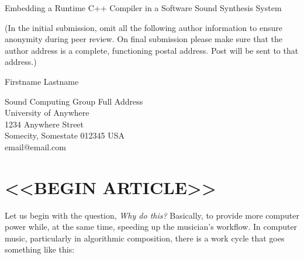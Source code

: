 \documentclass[letterpaper, 12pt]{article}
\begin{document}
{\cmjTitle Embedding a Runtime C++ Compiler in a Software Sound Synthesis System}
\vspace*{24pt}

(In the initial submission, omit all the following author information to ensure anonymity during peer review.
On final submission please make sure that the author address is a complete, functioning postal address.
Post will be sent to that address.)

{\cmjAuthor Firstname Lastname}	%
 
\begin{cmjAuthorAddress}
	Sound Computing Group Full Address\\
	University of Anywhere\\
	1234 Anywhere Street\\
	Somecity, Somestate 012345 USA\\		%
	email@email.com
\end{cmjAuthorAddress}


\begin{abstract}
	This article considers why musicians and researchers might want to use a C++ compiler embedded in a software synthesis (SWSS) system, and presents such a compiler in the form of new unit generators that embed the Clang/LLVM on-request compiler (ORC) in Csound. C++ source code may be embedded in a regular Csound orchestra file, compiled by the \texttt{clang\_compile} opcode, and invoked during performance by the \texttt{clang\_invoke} opcode. Uses include writing new signal processing and synthesis code in C++ right in the SWSS, full-strength algorithmic composition right in the SWSS, calling into external dynamic link libraries right from the SWSS, creating native user interfaces for a piece right in the SWSS, prototyping algorithms for later static compilation, and more. The technology and patterns presented here could be adapted for use in any SWSS that supports the C calling convention. 
\end{abstract}

\section{<<BEGIN ARTICLE>>}

Let us begin with the question, \textit{Why do this?} Basically, to provide more computer power while, at the same time, speeding up the musician's workflow. In computer music,  particularly in algorithmic composition, there is a work cycle that goes something like this:
\end{document}
